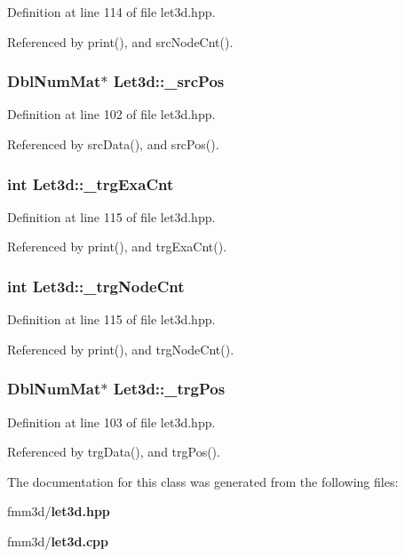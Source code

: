 Definition at line 114 of file let3d.hpp.

Referenced by print(), and src\-Node\-Cnt().
\subsubsection{\setlength{\rightskip}{0pt plus 5cm}Dbl\-Num\-Mat$\ast$ {\bf Let3d::\_\-src\-Pos}\hspace{0.3cm}{\tt  [protected]}}\label{classLet3d_f66b814fdf8eb17df56ff5ff27a368da_f66b814fdf8eb17df56ff5ff27a368da}




Definition at line 102 of file let3d.hpp.

Referenced by src\-Data(), and src\-Pos().
\subsubsection{\setlength{\rightskip}{0pt plus 5cm}int {\bf Let3d::\_\-trg\-Exa\-Cnt}\hspace{0.3cm}{\tt  [protected]}}\label{classLet3d_e3810553795b6707ebe1ca25636b6c1c_e3810553795b6707ebe1ca25636b6c1c}




Definition at line 115 of file let3d.hpp.

Referenced by print(), and trg\-Exa\-Cnt().
\subsubsection{\setlength{\rightskip}{0pt plus 5cm}int {\bf Let3d::\_\-trg\-Node\-Cnt}\hspace{0.3cm}{\tt  [protected]}}\label{classLet3d_59667b24a49a0f7a7c6235e7036e163a_59667b24a49a0f7a7c6235e7036e163a}




Definition at line 115 of file let3d.hpp.

Referenced by print(), and trg\-Node\-Cnt().
\subsubsection{\setlength{\rightskip}{0pt plus 5cm}Dbl\-Num\-Mat$\ast$ {\bf Let3d::\_\-trg\-Pos}\hspace{0.3cm}{\tt  [protected]}}\label{classLet3d_a1b44c7c6fd0a38be167c34537b1a508_a1b44c7c6fd0a38be167c34537b1a508}




Definition at line 103 of file let3d.hpp.

Referenced by trg\-Data(), and trg\-Pos().

The documentation for this class was generated from the following files:\begin{CompactItemize}
\item 
fmm3d/{\bf let3d.hpp}\item 
fmm3d/{\bf let3d.cpp}\end{CompactItemize}
